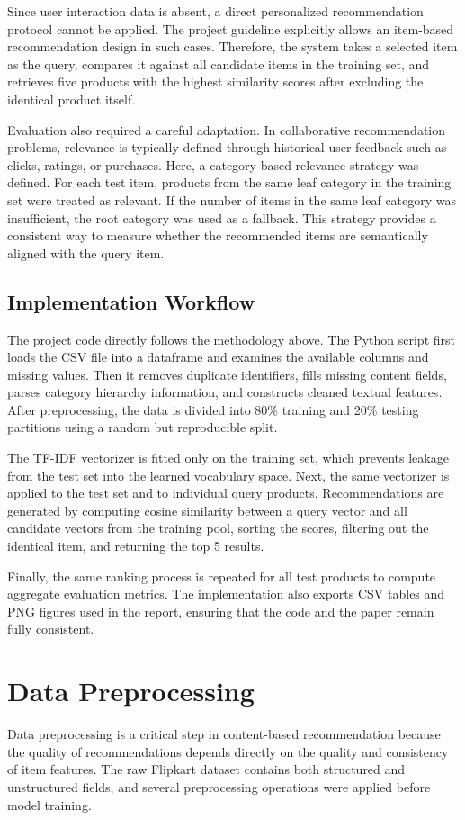 \documentclass[conference]{IEEEtran}
\begin{document}
Since user interaction data is absent, a direct personalized recommendation protocol cannot be applied. The project guideline explicitly allows an item-based recommendation design in such cases. Therefore, the system takes a selected item as the query, compares it against all candidate items in the training set, and retrieves five products with the highest similarity scores after excluding the identical product itself.

Evaluation also required a careful adaptation. In collaborative recommendation problems, relevance is typically defined through historical user feedback such as clicks, ratings, or purchases. Here, a category-based relevance strategy was defined. For each test item, products from the same leaf category in the training set were treated as relevant. If the number of items in the same leaf category was insufficient, the root category was used as a fallback. This strategy provides a consistent way to measure whether the recommended items are semantically aligned with the query item.

\subsection{Implementation Workflow}
The project code directly follows the methodology above. The Python script first loads the CSV file into a dataframe and examines the available columns and missing values. Then it removes duplicate identifiers, fills missing content fields, parses category hierarchy information, and constructs cleaned textual features. After preprocessing, the data is divided into 80\% training and 20\% testing partitions using a random but reproducible split.

The TF-IDF vectorizer is fitted only on the training set, which prevents leakage from the test set into the learned vocabulary space. Next, the same vectorizer is applied to the test set and to individual query products. Recommendations are generated by computing cosine similarity between a query vector and all candidate vectors from the training pool, sorting the scores, filtering out the identical item, and returning the top 5 results.

Finally, the same ranking process is repeated for all test products to compute aggregate evaluation metrics. The implementation also exports CSV tables and PNG figures used in the report, ensuring that the code and the paper remain fully consistent.

\section{Data Preprocessing}
Data preprocessing is a critical step in content-based recommendation because the quality of recommendations depends directly on the quality and consistency of item features. The raw Flipkart dataset contains both structured and unstructured fields, and several preprocessing operations were applied before model training.
\end{document}
